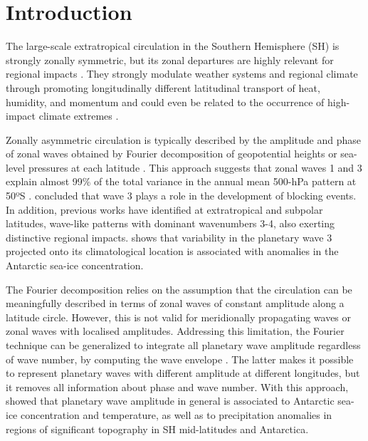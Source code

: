 \documentclass[pdflatex,sn-basic]{sn-jnl}
\theoremstyle{thmstyleone}%
\theoremstyle{thmstyletwo}%
\theoremstyle{thmstylethree}%
\begin{document}



\maketitle

\hypertarget{introduction}{%
\section{Introduction}\label{introduction}}

The large-scale extratropical circulation in the Southern Hemisphere (SH) is strongly zonally symmetric, but its zonal departures are highly relevant for regional impacts \citep[e.g.][]{hoskins2005}.
They strongly modulate weather systems and regional climate through promoting longitudinally different latitudinal transport of heat, humidity, and momentum \citep{trenberth1980a, raphael2007} and could even be related to the occurrence of high-impact climate extremes \citep{pezza2012}.

Zonally asymmetric circulation is typically described by the amplitude and phase of zonal waves obtained by Fourier decomposition of geopotential heights or sea-level pressures at each latitude \citep[e.g.][]{vanloon1972, trenberth1980a, turner2017}.
This approach suggests that zonal waves 1 and 3 explain almost 99\% of the total variance in the annual mean 500-hPa pattern at 50ºS \citep{vanloon1972}.
\citet{trenberth1985} concluded that wave 3 plays a role in the development of blocking events.
In addition, previous works have identified at extratropical and subpolar latitudes, wave-like patterns with dominant wavenumbers 3-4, also exerting distinctive regional impacts.
\citet{raphael2007} shows that variability in the planetary wave 3 projected onto its climatological location is associated with anomalies in the Antarctic sea-ice concentration.

The Fourier decomposition relies on the assumption that the circulation can be meaningfully described in terms of zonal waves of constant amplitude along a latitude circle.
However, this is not valid for meridionally propagating waves or zonal waves with localised amplitudes.
Addressing this limitation, the Fourier technique can be generalized to integrate all planetary wave amplitude regardless of wave number, by computing the wave envelope \citep{irving2015}.
The latter makes it possible to represent planetary waves with different amplitude at different longitudes, but it removes all information about phase and wave number.
With this approach, \citet{irving2015} showed that planetary wave amplitude in general is associated to Antarctic sea-ice concentration and temperature, as well as to precipitation anomalies in regions of significant topography in SH mid-latitudes and Antarctica.
\end{document}
